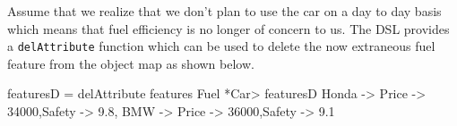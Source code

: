 \documentclass{jfp}
\newcommand{\prog}[1]{\texttt{#1}}
\begin{document}
Assume that we realize that we don't plan to use the car on a day to day basis which means that fuel efficiency is no longer of concern to us. The DSL provides a \prog{delAttribute} function which can be used to delete the now extraneous fuel feature from the object map as shown below. 
\begin{haskellcode}
featuresD = delAttribute features Fuel
*Car> featuresD
{Honda ->  {Price -> 34000,Safety -> 9.8},
 BMW   ->  {Price -> 36000,Safety -> 9.1}}
\end{haskellcode}







\end{document}
